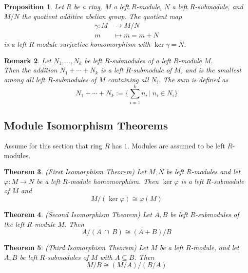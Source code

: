 \documentclass[a4paper,8pt]{article}
\newcommand{\hlt}[1]{\textit{{\color{blue}#1}}}
\theoremstyle{theorem}
\newtheorem{theorem}{Theorem}[subsection]
\newtheorem{proposition}[theorem]{Proposition}
\newtheorem{remark}[theorem]{Remark}
\begin{document}
\begin{proposition}
Let $R$ be a ring, $M$ a left $R$-module, $N$ a left $R$-submodule, and $M/N$ the quotient additive abelian group. The quotient map
\begin{align}
\gamma : M &\rightarrow M/N \nonumber \\
m &\mapsto \overline{m} = m+N \nonumber
\end{align}
is a left $R$-module surjective homomorphism with $\ker \gamma = N$.
\end{proposition}

\begin{remark}
Let $N_1, \ldots, N_k$ be left $R$-submodules of a left $R$-module $M$.\\
Then the addition $N_1 + \cdots + N_k$ is a left $R$-submodule of $M$, and is the smallest among all left $R$-submodules of $M$ containing all $N_i$. The sum is defined as
\begin{equation}
N_1 + \cdots + N_k := \{\sum_{i=1}^k n_i \ | \ n_i \in N_i\} \nonumber
\end{equation}
\end{remark}

\subsection{Module Isomorphism Theorems}

Assume for this section that ring $R$ has $1$. Modules are assumed to be left $R$-modules.

\begin{theorem}
\hlt{(First Isomorphism Theorem)}
Let $M,N$ be left $R$-modules and let $\varphi: M \rightarrow N$ be a left $R$-module homomorphism. Then $\ker \varphi$ is a left $R$-submodule of $M$ and
\begin{equation}
M/(\ker \varphi) \cong \varphi(M) \nonumber
\end{equation}
\end{theorem}

\begin{theorem}
\hlt{(Second Isomorphism Theorem)} Let $A, B$ be left $R$-submodules of the left $R$-module $M$. Then
\begin{equation}
A/(A \ \cap \ B) \cong (A+B) / B \nonumber
\end{equation}
\end{theorem}

\begin{theorem}
\hlt{(Third Isomorphism Theorem)} Let $M$ be a left $R$-module, and let $A,B$ be left $R$-submodules of $M$ with $A \subseteq B$. Then
\begin{equation}
M/B \cong (M/A)/(B/A) \nonumber
\end{equation}
\end{theorem}
\end{document}
